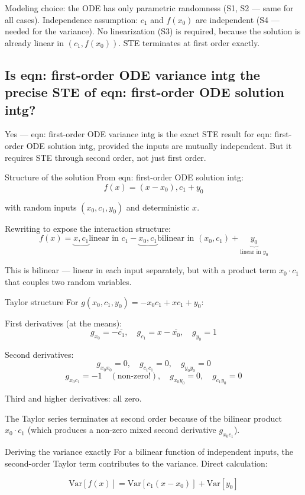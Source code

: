 \documentclass[twoside]{article}
\numberwithin{equation}{section}
\begin{document}
Modeling choice: the ODE has only parametric randomness (S1, S2 — same for all cases).
Independence assumption: $c_1$ and $f(x_0)$ are independent (S4 — needed for the variance).
No linearization (S3) is required, because the solution is already linear in $(c_1, f(x_0))$. STE terminates at first order exactly.

\subsection{Is {eqn: first-order ODE variance intg} the precise STE of {eqn: first-order ODE solution intg}?}

Yes — eqn: first-order ODE variance intg is the exact STE result for eqn: first-order ODE solution intg, provided the inputs are mutually independent. But it requires STE through second order, not just first order.

Structure of the solution
From eqn: first-order ODE solution intg:
$$f(x) = (x - x_0),c_1 + y_0$$

with random inputs $(x_0, c_1, y_0)$ and deterministic $x$.

Rewriting to expose the interaction structure:
$$f(x) = \underbrace{x, c_1}{\text{linear in } c_1} - \underbrace{x_0, c_1}{\text{bilinear in } (x_0, c_1)} + \underbrace{y_0}_{\text{linear in } y_0}$$

This is bilinear — linear in each input separately, but with a product term $x_0 \cdot c_1$ that couples two random variables.

Taylor structure
For $g(x_0, c_1, y_0) = -x_0 c_1 + x c_1 + y_0$:

First derivatives (at the means):
$$g_{x_0} = -\overline{c_1}, \quad g_{c_1} = x - \overline{x_0}, \quad g_{y_0} = 1$$

Second derivatives:
$$g_{x_0 x_0} = 0, \quad g_{c_1 c_1} = 0, \quad g_{y_0 y_0} = 0$$
$$g_{x_0 c_1} = -1 \quad (\text{non-zero!}), \quad g_{x_0 y_0} = 0, \quad g_{c_1 y_0} = 0$$

Third and higher derivatives: all zero.

The Taylor series terminates at second order because of the bilinear product $x_0 \cdot c_1$ (which produces a non-zero mixed second derivative $g_{x_0 c_1}$).

Deriving the variance exactly
For a bilinear function of independent inputs, the second-order Taylor term contributes to the variance. Direct calculation:

$$\text{Var}[f(x)] = \text{Var}[c_1(x - x_0)] + \text{Var}[y_0]$$
\end{document}
